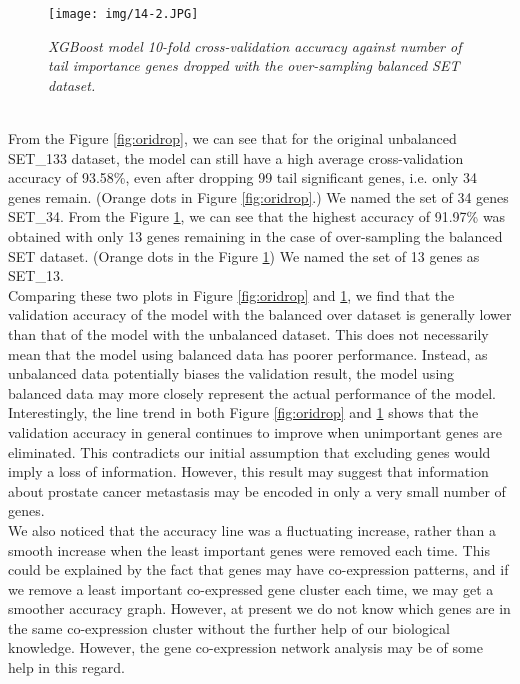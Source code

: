 \documentclass[12pt,a4paper]{report}
\begin{document}
\begin{figure}[h!]
\centering
\texttt{[image: img/14-2.JPG]}
\caption{\textit{XGBoost model 10-fold cross-validation accuracy against number of tail importance genes dropped with the over-sampling balanced SET dataset. }}
\label{fig:baldrop}
\end{figure}\\

From the Figure \ref{fig:oridrop}, we can see that for the original unbalanced SET\_133 dataset, the model can still have a high average cross-validation accuracy of 93.58\%, even after dropping 99 tail significant genes, i.e. only 34 genes remain. (Orange dots in Figure \ref{fig:oridrop}.) We named the set of 34 genes SET\_34. From the Figure \ref{fig:baldrop}, we can see that the highest accuracy of 91.97\% was obtained with only 13 genes remaining in the case of over-sampling the balanced SET dataset. (Orange dots in the Figure \ref{fig:baldrop}) We named the set of 13 genes as SET\_13.\\

Comparing these two plots in Figure \ref{fig:oridrop} and \ref{fig:baldrop}, we find that the validation accuracy of the model with the balanced over dataset is generally lower than that of the model with the unbalanced dataset. This does not necessarily mean that the model using balanced data has poorer performance. Instead, as unbalanced data potentially biases the validation result, the model using balanced data may more closely represent the actual performance of the model.\\

Interestingly, the line trend in both Figure \ref{fig:oridrop} and \ref{fig:baldrop} shows that the validation accuracy in general continues to improve when unimportant genes are eliminated. This contradicts our initial assumption that excluding genes would imply a loss of information. However, this result may suggest that information about prostate cancer metastasis may be encoded in only a very small number of genes.\\

We also noticed that the accuracy line was a fluctuating increase, rather than a smooth increase when the least important genes were removed each time. This could be explained by the fact that genes may have co-expression patterns, and if we remove a least important co-expressed gene cluster each time, we may get a smoother accuracy graph. However, at present we do not know which genes are in the same co-expression cluster without the further help of our biological knowledge. However, the gene co-expression network analysis may be of some help in this regard.\\
\end{document}
